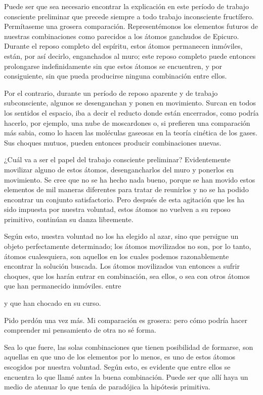 \documentclass[a4paper, 12pt, draft]{article}
\begin{document}
Puede ser que sea necesario encontrar la explicación en este período de trabajo consciente preliminar que precede siempre a todo trabajo
inconsciente fructífero. Permítaseme una grosera comparación.
Representémonos los elementos futuros de nuestras combinaciones como
parecidos a los átomos ganchudos de Epicuro. Durante el reposo completo
del espíritu, estos átomos permanecen inmóviles, están,
por así decirlo, enganchados al muro; este reposo completo puede
entonces prolongarse indefinidamente sin que estos átomos se encuentren, y por consiguiente, sin que pueda producirse ninguna combinación
entre ellos.

Por el contrario, durante un período de reposo aparente y de trabajo
subconsciente, algunos se desenganchan y ponen en movimiento. Surcan en
todos los sentidos el espacio, iba a decir el reducto donde están
encerrados, como podría hacerlo, por ejemplo, una nube de moscardones
o, si prefieren una comparación más sabia, como lo hacen las moléculas gaseosas en la teoría cinética de los gases. Sus choques
mutuos, pueden entonces producir combinaciones nuevas.

¿Cuál va a ser el papel del trabajo consciente preliminar?
Evidentemente movilizar alguno de estos átomos, desengancharlos del muro
y ponerlos en movimiento. Se cree que no se ha hecho nada bueno, porque se
han movido estos elementos de mil maneras diferentes para tratar de
reunirlos y no se ha podido encontrar un conjunto satisfactorio. Pero después de esta agitación que les ha sido impuesta por nuestra voluntad,
estos átomos no vuelven a su reposo primitivo, continúan su danza
libremente.

Según esto, nuestra voluntad no los ha elegido al azar, sino que
persigue un objeto perfectamente determinado; los átomos movilizados no
son, por lo tanto, átomos cualesquiera, son aquellos en los cuales
podemos razonablemente encontrar la solución buscada. Los átomos
movilizados van entonces a sufrir choques, que los harán entrar en
combinación, sea ellos, 
o sea con otros átomos que han permanecido inmóviles. entre



y que han chocado en su curso.




Pido perdón una vez más. Mi comparación es grosera: pero cómo podría hacer comprender mi pensamiento de otra no sé
forma.



Sea lo que fuere, las solas combinaciones que tienen posibilidad de
formarse, son aquellas en que uno de los elementos por lo menos, es uno
de estos átomos escogidos por nuestra voluntad. Según esto, es
evidente que entre ellos se encuentra lo que llamé antes la buena
combinación. Puede ser que allí haya un medio de atenuar lo que tenía de paradójica la hipótesis primitiva.
\end{document}
